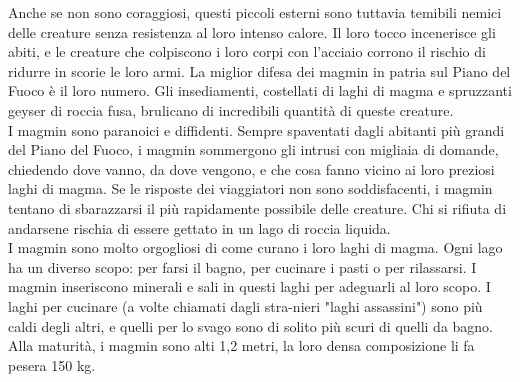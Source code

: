 \begin{multicols}{2}
Anche se non sono coraggiosi, questi piccoli esterni sono tuttavia temibili nemici delle creature senza resistenza al loro intenso calore. Il loro tocco incenerisce gli abiti, e le creature che colpiscono i loro corpi con l'acciaio corrono il rischio di ridurre in scorie le loro armi. La miglior difesa dei magmin in patria sul Piano del Fuoco è il loro numero. Gli insediamenti, costellati di laghi di magma e spruzzanti geyser di roccia fusa, brulicano di incredibili quantità di queste creature.\\

I magmin sono paranoici e diffidenti. Sempre spaventati dagli abitanti più grandi del Piano del Fuoco, i magmin sommergono gli intrusi con migliaia di domande, chiedendo dove vanno, da dove vengono, e che cosa fanno vicino ai loro preziosi laghi di magma. Se le risposte dei viaggiatori non sono soddisfacenti, i magmin tentano di sbarazzarsi il più rapidamente possibile delle creature. Chi si rifiuta di andarsene rischia di essere gettato in un lago di roccia liquida.\\

I magmin sono molto orgogliosi di come curano i loro laghi di magma. Ogni lago ha un diverso scopo: per farsi il bagno, per cucinare i pasti o per rilassarsi. I magmin inseriscono minerali e sali in questi laghi per adeguarli al loro scopo. I laghi per cucinare (a volte chiamati dagli stra-nieri "laghi assassini") sono più caldi degli altri, e quelli per lo svago sono di solito più scuri di quelli da bagno.\\

Alla maturità, i magmin sono alti 1,2 metri, la loro densa composizione li fa pesera 150 kg.\\


\end{multicols}

